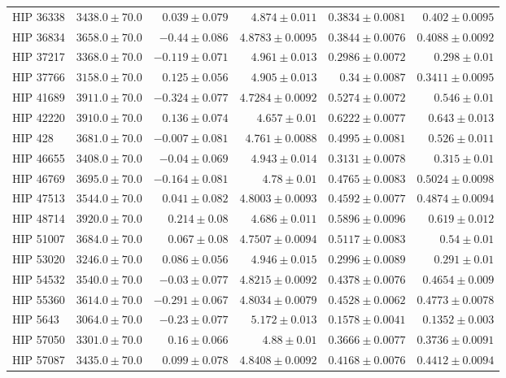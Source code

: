 \begin{longtable*}{lrrrrr}
HIP 36338 & $3438.0\pm 70.0$ & $0.039\pm 0.079$ & $4.874\pm 0.011$ & $0.3834\pm 0.0081$ & $0.402\pm 0.0095$ \\ 
HIP 36834 & $3658.0\pm 70.0$ & $-0.44\pm 0.086$ & $4.8783\pm 0.0095$ & $0.3844\pm 0.0076$ & $0.4088\pm 0.0092$ \\ 
HIP 37217 & $3368.0\pm 70.0$ & $-0.119\pm 0.071$ & $4.961\pm 0.013$ & $0.2986\pm 0.0072$ & $0.298\pm 0.01$ \\ 
HIP 37766 & $3158.0\pm 70.0$ & $0.125\pm 0.056$ & $4.905\pm 0.013$ & $0.34\pm 0.0087$ & $0.3411\pm 0.0095$ \\ 
HIP 41689 & $3911.0\pm 70.0$ & $-0.324\pm 0.077$ & $4.7284\pm 0.0092$ & $0.5274\pm 0.0072$ & $0.546\pm 0.01$ \\ 
HIP 42220 & $3910.0\pm 70.0$ & $0.136\pm 0.074$ & $4.657\pm 0.01$ & $0.6222\pm 0.0077$ & $0.643\pm 0.013$ \\ 
HIP 428 & $3681.0\pm 70.0$ & $-0.007\pm 0.081$ & $4.761\pm 0.0088$ & $0.4995\pm 0.0081$ & $0.526\pm 0.011$ \\ 
HIP 46655 & $3408.0\pm 70.0$ & $-0.04\pm 0.069$ & $4.943\pm 0.014$ & $0.3131\pm 0.0078$ & $0.315\pm 0.01$ \\ 
HIP 46769 & $3695.0\pm 70.0$ & $-0.164\pm 0.081$ & $4.78\pm 0.01$ & $0.4765\pm 0.0083$ & $0.5024\pm 0.0098$ \\ 
HIP 47513 & $3544.0\pm 70.0$ & $0.041\pm 0.082$ & $4.8003\pm 0.0093$ & $0.4592\pm 0.0077$ & $0.4874\pm 0.0094$ \\ 
HIP 48714 & $3920.0\pm 70.0$ & $0.214\pm 0.08$ & $4.686\pm 0.011$ & $0.5896\pm 0.0096$ & $0.619\pm 0.012$ \\ 
HIP 51007 & $3684.0\pm 70.0$ & $0.067\pm 0.08$ & $4.7507\pm 0.0094$ & $0.5117\pm 0.0083$ & $0.54\pm 0.01$ \\ 
HIP 53020 & $3246.0\pm 70.0$ & $0.086\pm 0.056$ & $4.946\pm 0.015$ & $0.2996\pm 0.0089$ & $0.291\pm 0.01$ \\ 
HIP 54532 & $3540.0\pm 70.0$ & $-0.03\pm 0.077$ & $4.8215\pm 0.0092$ & $0.4378\pm 0.0076$ & $0.4654\pm 0.009$ \\ 
HIP 55360 & $3614.0\pm 70.0$ & $-0.291\pm 0.067$ & $4.8034\pm 0.0079$ & $0.4528\pm 0.0062$ & $0.4773\pm 0.0078$ \\ 
HIP 5643 & $3064.0\pm 70.0$ & $-0.23\pm 0.077$ & $5.172\pm 0.013$ & $0.1578\pm 0.0041$ & $0.1352\pm 0.003$ \\ 
HIP 57050 & $3301.0\pm 70.0$ & $0.16\pm 0.066$ & $4.88\pm 0.01$ & $0.3666\pm 0.0077$ & $0.3736\pm 0.0091$ \\ 
HIP 57087 & $3435.0\pm 70.0$ & $0.099\pm 0.078$ & $4.8408\pm 0.0092$ & $0.4168\pm 0.0076$ & $0.4412\pm 0.0094$ \\ 

\end{longtable*}

